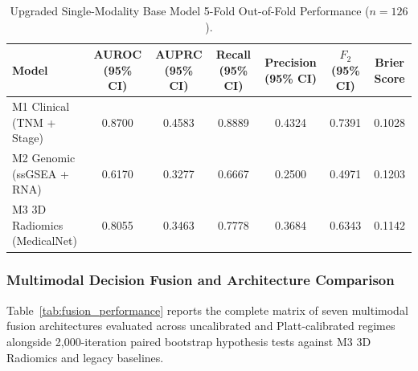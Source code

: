 \begin{table}[t]
\centering
\caption{Upgraded Single-Modality Base Model 5-Fold Out-of-Fold Performance ($n = 126$).}
\label{tab:base_performance}
\small
\begin{tabularx}{\textwidth}{@{} L C C C C C c @{}}
\toprule
\textbf{Model} & \textbf{AUROC (95\% CI)} & \textbf{AUPRC (95\% CI)} & \textbf{Recall (95\% CI)} & \textbf{Precision (95\% CI)} & \textbf{$F_2$ (95\% CI)} & \textbf{Brier Score} \\
\midrule
M1 Clinical (TNM + Stage) & 0.8700 \newline [0.7966--0.9344] & 0.4583 \newline [0.3210--0.6184] & 0.8889 \newline [0.7222--1.0000] & 0.4324 \newline [0.3125--0.5625] & 0.7391 \newline [0.6122--0.8529] & 0.1028 \\
\addlinespace
M2 Genomic (ssGSEA + RNA) & 0.6170 \newline [0.4649--0.7604] & 0.3277 \newline [0.1850--0.5210] & 0.6667 \newline [0.4444--0.8889] & 0.2500 \newline [0.1538--0.3636] & 0.4971 \newline [0.3571--0.6452] & 0.1203 \\
\addlinespace
M3 3D Radiomics (MedicalNet) & 0.8055 \newline [0.7060--0.8982] & 0.3463 \newline [0.2105--0.5430] & 0.7778 \newline [0.5556--0.9444] & 0.3684 \newline [0.2432--0.5185] & 0.6343 \newline [0.4854--0.7792] & 0.1142 \\
\bottomrule
\end{tabularx}
\end{table}

\subsubsection{Multimodal Decision Fusion and Architecture Comparison}
Table~\ref{tab:fusion_performance} reports the complete matrix of seven multimodal fusion architectures evaluated across uncalibrated and Platt-calibrated regimes alongside 2,000-iteration paired bootstrap hypothesis tests against M3 3D Radiomics and legacy baselines. 

